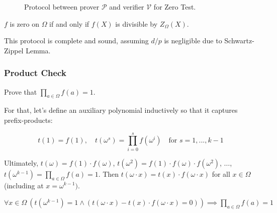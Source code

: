 \documentclass[../lecture-notes.tex]{subfiles}
\begin{document}
\begin{figure}[H]
  \caption{Protocol between prover $\mathcal{P}$ and verifier $\mathcal{V}$ for Zero Test.}
  \label{fig:polynomial_commitment}
\end{figure}

\begin{lemma}
    $f$ is zero on $\Omega$ if and only if $f(X)$ is divisible by $Z_{\Omega}(X)$.
\end{lemma}

\begin{remark}
This protocol is complete and sound, assuming $d/p$ is negligible due to Schwartz-Zippel Lemma.
\end{remark}

\subsubsection{Product Check}

Prove that $\prod_{a \in \Omega} f(a) = 1$.

For that, let's define an auxiliary polynomial inductively so that it captures prefix-products:

\[t(1) = f(1), \quad t(\omega^s) = \prod_{i=0}^{s} f(\omega^i) \quad \text{for } s = 1, ..., k-1\]

Ultimately,  \(t(\omega) = f(1) \cdot f(\omega)\),  \(t(\omega^2) = f(1) \cdot f(\omega) \cdot f(\omega^2)\), \(\dots\), \(t(\omega^{k-1}) = \prod_{a \in \Omega} f(a) = 1\). Then \(t(\omega \cdot x) = t(x) \cdot f(\omega \cdot x)\) for all \(x \in \Omega\) (including at \(x = \omega^{k-1} \text{)}\).

\begin{lemma}
\(\forall x \in \Omega \  (t(\omega^{k-1}) = 1  \land (t(\omega \cdot x) - t(x) \cdot f(\omega \cdot x) = 0)) \implies \prod_{a \in \Omega} f(a) = 1\)
\end{lemma}
\end{document}
